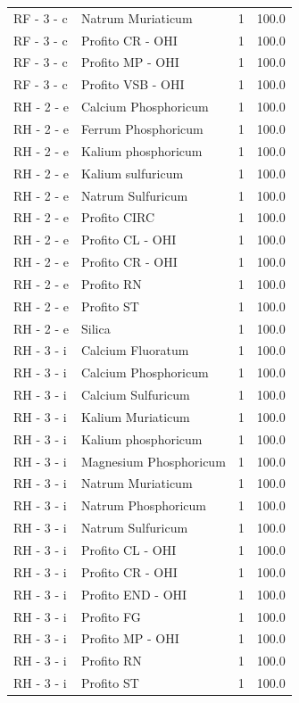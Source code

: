 \documentclass[a4paper,11pt]{article}
\begin{document}
\begin{footnotesize}
\begin{longtable}{p{3.5cm}p{7.5cm}rr}
RF - 3 - c & Natrum Muriaticum & 1 & 100.0 \\
RF - 3 - c & Profito CR - OHI & 1 & 100.0 \\
RF - 3 - c & Profito MP - OHI & 1 & 100.0 \\
RF - 3 - c & Profito VSB - OHI & 1 & 100.0 \\
RH - 2 - e & Calcium Phosphoricum & 1 & 100.0 \\
RH - 2 - e & Ferrum Phosphoricum & 1 & 100.0 \\
RH - 2 - e & Kalium phosphoricum & 1 & 100.0 \\
RH - 2 - e & Kalium sulfuricum & 1 & 100.0 \\
RH - 2 - e & Natrum Sulfuricum & 1 & 100.0 \\
RH - 2 - e & Profito CIRC & 1 & 100.0 \\
RH - 2 - e & Profito CL - OHI & 1 & 100.0 \\
RH - 2 - e & Profito CR - OHI & 1 & 100.0 \\
RH - 2 - e & Profito RN & 1 & 100.0 \\
RH - 2 - e & Profito ST & 1 & 100.0 \\
RH - 2 - e & Silica & 1 & 100.0 \\
RH - 3 - i & Calcium Fluoratum & 1 & 100.0 \\
RH - 3 - i & Calcium Phosphoricum & 1 & 100.0 \\
RH - 3 - i & Calcium Sulfuricum & 1 & 100.0 \\
RH - 3 - i & Kalium Muriaticum & 1 & 100.0 \\
RH - 3 - i & Kalium phosphoricum & 1 & 100.0 \\
RH - 3 - i & Magnesium Phosphoricum & 1 & 100.0 \\
RH - 3 - i & Natrum Muriaticum & 1 & 100.0 \\
RH - 3 - i & Natrum Phosphoricum & 1 & 100.0 \\
RH - 3 - i & Natrum Sulfuricum & 1 & 100.0 \\
RH - 3 - i & Profito CL - OHI & 1 & 100.0 \\
RH - 3 - i & Profito CR - OHI & 1 & 100.0 \\
RH - 3 - i & Profito END - OHI & 1 & 100.0 \\
RH - 3 - i & Profito FG & 1 & 100.0 \\
RH - 3 - i & Profito MP - OHI & 1 & 100.0 \\
RH - 3 - i & Profito RN & 1 & 100.0 \\
RH - 3 - i & Profito ST & 1 & 100.0 \\

\end{longtable}
\end{footnotesize}
\end{document}
